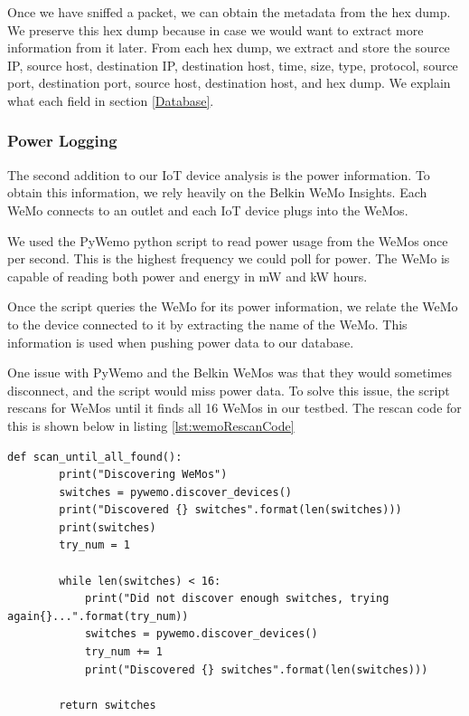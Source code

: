 Once we have sniffed a packet, we can obtain the metadata from the hex dump. We preserve this hex dump because in case we would want to extract more information from it later. From each hex dump, we extract and store the source IP, source host, destination IP, destination host, time, size, type, protocol, source port, destination port, source host, destination host, and hex dump. We explain what each field in section \ref{Database}.

\subsubsection{Power Logging}

The second addition to our IoT device analysis is the power information. To obtain this information, we rely heavily on the Belkin WeMo Insights. Each WeMo connects to an outlet and each IoT device plugs into the WeMos.

We used the PyWemo python script \cite{pywemo} to read power usage from the WeMos once per second. This is the highest frequency we could poll for power. The WeMo is capable of reading both power and energy in mW and kW hours.

Once the script queries the WeMo for its power information, we relate the WeMo to the device connected to it by extracting the name of the WeMo. This information is used when pushing power data to our database.

One issue with PyWemo and the Belkin WeMos was that they would sometimes disconnect, and the script would miss power data. To solve this issue, the script rescans for WeMos until it finds all 16 WeMos in our testbed. The rescan code for this is shown below in listing \ref{lst:wemoRescanCode}

\noindent
\begin{minipage}{\textwidth}
\begin{lstlisting}[label={lst:wemoRescanCode},caption={Rescan if all WeMos not found.}]
    def scan_until_all_found():
        print("Discovering WeMos")
        switches = pywemo.discover_devices()
        print("Discovered {} switches".format(len(switches)))
        print(switches)
        try_num = 1

        while len(switches) < 16:
            print("Did not discover enough switches, trying again{}...".format(try_num))
            switches = pywemo.discover_devices()
            try_num += 1
            print("Discovered {} switches".format(len(switches)))

        return switches
\end{lstlisting}
\end{minipage}

